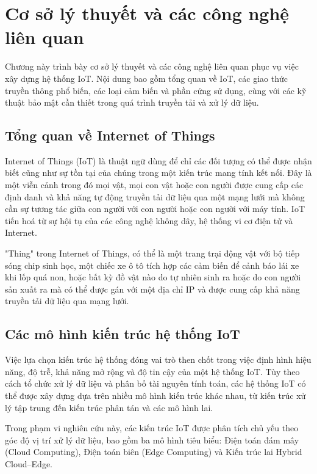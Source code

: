 \chapter{Cơ sở lý thuyết và các công nghệ liên quan}
Chương này trình bày cơ sở lý thuyết và các công nghệ liên quan phục vụ việc xây dựng hệ thống IoT. Nội dung bao gồm tổng quan về IoT, các giao thức truyền thông phổ biến, các loại cảm biến và phần cứng sử dụng, cùng với các kỹ thuật bảo mật cần thiết trong quá trình truyền tải và xử lý dữ liệu.
\section{Tổng quan về Internet of Things}
Internet of Things (IoT) là thuật ngữ dùng để chỉ các đối tượng có thể được nhận biết cũng như sự tồn tại của chúng trong một kiến trúc mang tính kết nối. Đây là một viễn cảnh trong đó mọi vật, mọi con vật hoặc con người được cung cấp các định danh và khả năng tự động truyền tải dữ liệu qua một mạng lưới mà không cần sự tương tác giữa con người với con người hoặc con người với máy tính. IoT tiến hoá từ sự hội tụ của các công nghệ không dây, hệ thống vi cơ điện tử và Internet. 

"Thing" trong Internet of Things, có thể là một trang trại động vật với bộ tiếp sóng chip sinh học, một chiếc xe ô tô tích hợp các cảm biến để cảnh báo lái xe khi lốp quá non, hoặc bất kỳ đồ vật nào do tự nhiên sinh ra hoặc do con người sản xuất ra mà có thể được gán với một địa chỉ IP và được cung cấp khả năng truyền tải dữ liệu qua mạng lưới.

\section{Các mô hình kiến trúc hệ thống IoT}
Việc lựa chọn kiến trúc hệ thống đóng vai trò then chốt trong việc định hình hiệu
năng, độ trễ, khả năng mở rộng và độ tin cậy của một hệ thống IoT. Tùy theo cách tổ
chức xử lý dữ liệu và phân bố tài nguyên tính toán, các hệ thống IoT có thể được
xây dựng dựa trên nhiều mô hình kiến trúc khác nhau, từ kiến trúc xử lý tập trung
đến kiến trúc phân tán và các mô hình lai.

Trong phạm vi nghiên cứu này, các kiến trúc IoT được phân tích chủ yếu theo góc
độ vị trí xử lý dữ liệu, bao gồm ba mô hình tiêu biểu: Điện toán đám mây (Cloud
Computing), Điện toán biên (Edge Computing) và Kiến trúc lai Hybrid Cloud--Edge.

